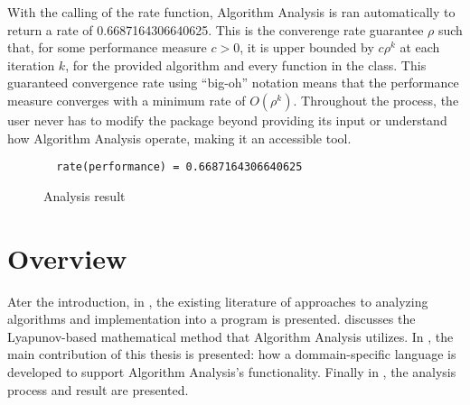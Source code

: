 With the calling of the rate function, Algorithm Analysis is ran automatically to return a rate of 0.6687164306640625. This is the converenge rate guarantee $\rho$ such that, for some performance measure $c>0$, it is upper bounded by $c \rho^k$ at each iteration $k$, for the provided algorithm and every function in the class. This guaranteed convergence rate using ``big-oh'' notation means that the performance measure converges with a minimum rate of $O(\rho^k)$. Throughout the process, the user never has to modify the package beyond providing its input or understand how Algorithm Analysis operate, making it an accessible tool.

\begin{figure}[hbtp]
  \begin{lstlisting}
  rate(performance) = 0.6687164306640625
  \end{lstlisting}
  \caption{Analysis result}
  \label{ex_result}
\end{figure}

\section{Overview} \label{sectionOverview}



Ater the introduction, in , the existing literature of approaches to analyzing algorithms and implementation into a program is presented.  discusses the Lyapunov-based mathematical method that Algorithm Analysis utilizes. In , the main contribution of this thesis is presented: how a dommain-specific language is developed to support Algorithm Analysis's functionality. Finally in , the analysis process and result are presented.

